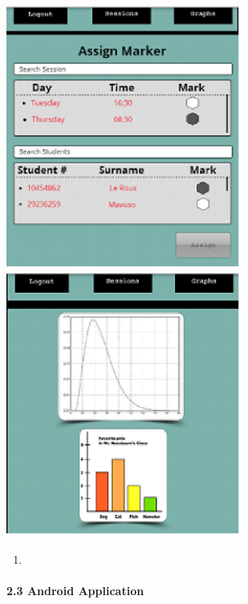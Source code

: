 \documentclass{article}
\begin{document}
\noindent \textbf{\includegraphics*[width=3.05in, height=3.41in, keepaspectratio=false]{image11}    \includegraphics*[width=3.05in, height=3.41in, keepaspectratio=false]{image12}}

\noindent \textbf{}

\noindent \textbf{}

\noindent \textbf{}

\begin{enumerate}
\item \textbf{ }
\end{enumerate}

\noindent  

\noindent 

\noindent 

\noindent 

\noindent 


\paragraph{2.3  Android Application}
\end{document}
